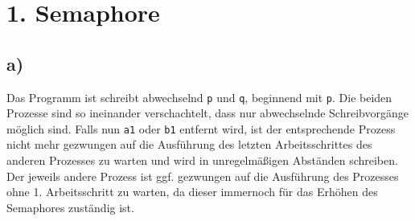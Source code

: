 



\newcommand{\professor}{Wolfgang Mulzer}
\newcommand{\tutor}{Johannes Nixdorf}
\newcommand{\gender}{m}
\newcommand{\tutorial}{4 (Do, 8-10 Uhr)}
\newcommand{\exercise}{06}
\newcommand{\course}{Nichtsequentielle und verteilte Programmierung}
\newcommand{\semester}{SoSe 18}
\newcommand{\students}{Mark Niehues, Anton Oehler}
\newcommand{\taskCount}{3}



\head %

\section*{1. Semaphore}
\subsection*{a)}
Das Programm ist schreibt abwechselnd \texttt{p} und \texttt{q}, beginnend mit \texttt{p}. Die beiden Prozesse sind so ineinander verschachtelt, dass nur abwechselnde Schreibvorgänge möglich sind. Falls nun \texttt{a1} oder \texttt{b1} entfernt wird, ist der entsprechende Prozess nicht mehr gezwungen auf die Ausführung des letzten Arbeitsschrittes des anderen Prozesses zu warten und wird in unregelmäßigen Abständen schreiben. Der jeweils andere Prozess ist ggf. gezwungen auf die Ausführung des Prozesses ohne 1. Arbeitsschritt zu warten, da dieser immernoch für das Erhöhen des Semaphores zuständig ist.

